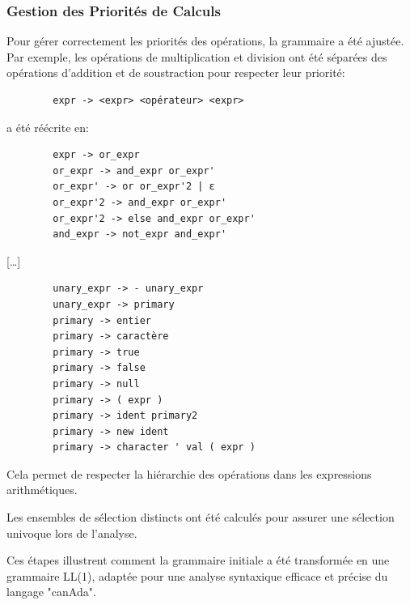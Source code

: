 \documentclass[french,a4paper]{article}
\begin{document}
    \subsubsection{Gestion des Priorités de Calculs}
    Pour gérer correctement les priorités des opérations, la grammaire a été ajustée. Par exemple, les opérations de multiplication et division ont été séparées des opérations d'addition et de soustraction pour respecter leur priorité:
    \begin{verbatim}
        expr -> <expr> <opérateur> <expr>
    \end{verbatim}
    a été réécrite en:
    \begin{verbatim}
        expr -> or_expr
        or_expr -> and_expr or_expr'
        or_expr' -> or or_expr'2 | ε
        or_expr'2 -> and_expr or_expr'
        or_expr'2 -> else and_expr or_expr'
        and_expr -> not_expr and_expr'
        \end{verbatim}
    [\dots]
    \begin{verbatim}
        unary_expr -> - unary_expr
        unary_expr -> primary
        primary -> entier
        primary -> caractère
        primary -> true
        primary -> false
        primary -> null
        primary -> ( expr )
        primary -> ident primary2
        primary -> new ident
        primary -> character ' val ( expr )
    \end{verbatim}
    Cela permet de respecter la hiérarchie des opérations dans les expressions arithmétiques.

    Les ensembles de sélection distincts ont été calculés pour assurer une sélection univoque lors de l'analyse.

    Ces étapes illustrent comment la grammaire initiale a été transformée en une grammaire LL(1), adaptée pour une analyse syntaxique efficace et précise du langage "canAda".
\end{document}
